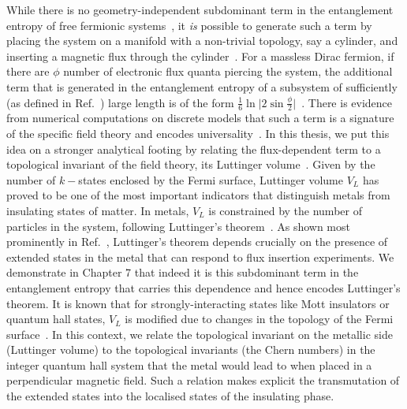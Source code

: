 While there is no geometry-independent subdominant term in the entanglement entropy of free fermionic systems~\cite{Chen_2017,bueno_2017}, it {\it is} possible to generate such a term by placing the system on a manifold with a non-trivial topology, say a cylinder, and inserting a magnetic flux through the cylinder~\cite{Metlitski_2009,Arias_2015,Whitsitt_2017,Chen_2017,zhu_kagome_2018}.
For a massless Dirac fermion, if there are \(\phi\) number of electronic flux quanta piercing the system, the additional term that is generated in the entanglement entropy of a subsystem of sufficiently (as defined in Ref.~\cite{Chen_2017}) large length is of the form $\frac{1}{6}\ln \big|2\sin \frac{\phi}{2}\big|$~\cite{Chen_2017,Arias_2015}.
There is evidence from numerical computations on discrete models that such a term is a signature of the specific field theory and encodes universality~\cite{zhu_kagome_2018,Hu_triangular_2019,crepel_2021}. In this thesis, we put this idea on a stronger analytical footing by relating the flux-dependent term to a topological invariant of the field theory, its Luttinger volume~\cite{luttinger1960fermi,luttinger1960ground,oshikawa2000topological,seki2017topological,Heath_2020,anirbanurg1,anirbanurg2}. Given by the number of \(k-\)states enclosed by the Fermi surface, Luttinger volume \(V_L\) has proved to be one of the most important indicators that distinguish metals from insulating states of matter. In metals, \(V_L\) is constrained by the number of particles in the system, following Luttinger's theorem~\cite{luttinger1960fermi,luttinger1960ground,oshikawa2000topological}. As shown most prominently in  Ref.~\cite{oshikawa2000topological}, Luttinger's theorem depends crucially on the presence of extended states in the metal that can respond to flux insertion experiments. We demonstrate in Chapter 7 that indeed it is this subdominant term in the entanglement entropy that carries this dependence and hence encodes Luttinger's theorem. It is known that for strongly-interacting states like Mott insulators or quantum hall states, \(V_L\) is modified due to changes in the topology of the Fermi surface~\cite{Heath_2020,seki2017topological,anirbanurg1,anirbanurg2}. In this context, we relate the topological invariant on the metallic side (Luttinger volume) to the topological invariants (the Chern numbers) in the integer quantum hall system that the metal would lead to when placed in a perpendicular magnetic field. Such a relation makes explicit the transmutation of the extended states into the localised states of the insulating phase.

